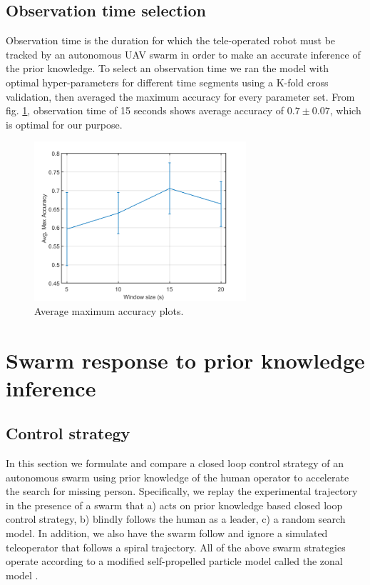 \documentclass{article}
\begin{document}

\clearpage
\subsection{Observation time selection}
Observation time is the duration for which the tele-operated robot must be tracked by an autonomous UAV swarm in order to make an accurate inference of the prior knowledge. To select an observation time we ran the model with optimal hyper-parameters for different time segments using a K-fold cross validation, then averaged the maximum accuracy for every parameter set. From fig. \ref{fig:AvgMaxAcc}, observation time of 15 seconds shows average accuracy of $0.7 \pm 0.07$, which is optimal for our purpose.

\begin{figure}[ht!]
\centering
\includegraphics[width=0.7\textwidth]{images/maxAccuracyResults.png}
\caption[width=0.5\textwidth]{Average maximum accuracy plots.}
\label{fig:AvgMaxAcc}
\end{figure}


\section{Swarm response to prior knowledge inference}
\subsection{Control strategy} \label{sec:controlStrategy}
In this section we formulate and compare a closed loop control strategy of an autonomous swarm using prior knowledge of the human operator to accelerate the search for missing person. Specifically, we replay the experimental trajectory in the presence of a swarm that a) acts on prior knowledge based closed loop control strategy, b) blindly follows the human as a leader, c) a random search model. In addition, we also have the swarm follow and ignore a simulated teleoperator that follows a spiral trajectory. All of the above swarm strategies operate according to a modified self-propelled particle model called the zonal model \cite{Couzin}. 
\end{document}
